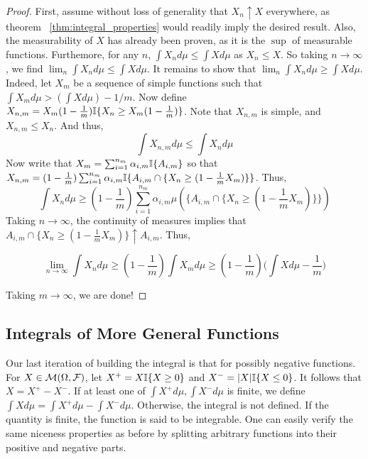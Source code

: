     \begin{proof}
        
        First, assume without loss of generality that $X_n \uparrow X$ everywhere, as theorem ~\ref{thm:integral_properties} would readily 
        imply the desired result. Also, the measurability of $X$ has already been proven, as it is the $\sup$ of measurable 
        functions. Furthemore, for any $n$, $\int X_n d\mu \leq \int X d\mu$ as $X_n \leq X$. So taking 
        $n \to \infty$, we find $\lim_n \int X_n d\mu \leq \int X d\mu$. It remains to show that 
        $\lim_n \int X_n d\mu \geq \int X d\mu$. Indeed, let $X_m$ be a sequence of simple 
        functions such that $\int X_m d\mu > (\int X d\mu) - 1/m$. Now define $X_{n,m} = X_m (1-\frac{1}{m})\mathbb I\{X_n \geq X_m(1-\frac{1}{m})\}$.
        Note that $X_{n,m}$ is simple, and $X_{n,m} \leq X_n$. And thus, 
        \[ \int X_{n,m} d\mu \leq \int X_n d\mu \]
        Now write that $X_m = \sum_{i=1}^{n_m} \alpha_{i,m} \mathbb I\{A_{i,m}\}$ so that $X_{n,m} = (1-\frac{1}{m}) \sum_{i=1}^{n_m} \alpha_{i,m} \mathbb I\{A_{i,m} \cap \{X_n \geq (1-\frac{1}{m}X_m) \} \}$.
        Thus, 
        \[ \int X_n d\mu \geq (1-\frac{1}{m}) \sum_{i=1}^{n_m}\alpha_{i,m} \mu(\{A_{i,m} \cap \{X_n \geq (1-\frac{1}{m}X_m) \} \}) \] 
        Taking $n \to \infty$, the continuity of measures implies that $A_{i,m} \cap \{X_n \geq (1-\frac{1}{m}X_m)\} \uparrow A_{i,m}$. Thus, 

        \[ \lim_{n \to \infty} \int X_n d\mu \geq (1-\frac{1}{m}) \int X_m d\mu \geq (1 - \frac{1}{m}) \bigg( \int X d\mu - \frac{1}{m} \bigg)\] 

        Taking $m \to \infty$, we are done!

    \end{proof}

    \subsection{Integrals of More General Functions}

    Our last iteration of building the integral is that for possibly negative functions. 
    For $X \in \mathcal M(\Omega, \mathcal F)$, let $X^+ = X\mathbb I\{X \geq 0\}$ and $X^- = |X|\mathbb I\{X \leq 0\}$. It follows that 
    $X = X^+ - X^-$. If at least one of $\int X^+d\mu, \int X^- d\mu$ is finite, we define $\int X d\mu
     = \int X^+ d\mu - \int X^- d\mu$. Otherwise, the integral is not defined. If the quantity is finite, the 
     function is said to be integrable.
      One can easily verify the 
    same niceness properties as before by splitting arbitrary functions into their positive and negative parts. 

